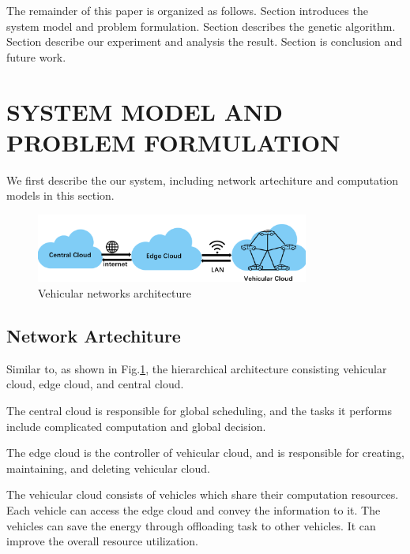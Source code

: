 \documentclass[conference]{IEEEtran}
\begin{document}
The remainder of this paper is organized as follows. Section \uppercase\expandafter{} introduces the system model and problem formulation. 
Section \uppercase\expandafter{} describes the genetic algorithm. 
Section \uppercase\expandafter{}  describe our experiment and analysis the result. 
Section \uppercase\expandafter{}
is conclusion and future work. 

\section{SYSTEM MODEL AND PROBLEM FORMULATION}
We first describe the our system, including network artechiture and computation models in this section.


\begin{figure}[h]
	\centering
	\includegraphics[width=0.80\textwidth]{pic2.png}
	\caption{Vehicular networks architecture}
	\label{cloud}
	
\end{figure}

\subsection{Network Artechiture}
Similar to\cite{yu2013toward}, as shown in Fig.\ref{cloud}, the hierarchical architecture consisting vehicular cloud, edge cloud, and central cloud.

The central cloud is responsible for global scheduling, and the tasks it performs include complicated computation and global decision.

The edge cloud is the controller of vehicular cloud, and is responsible for creating, maintaining, and deleting vehicular cloud. 

The vehicular cloud consists of vehicles which share their computation resources. Each vehicle can access the edge cloud and convey the information to it. The vehicles can save the energy through offloading task to other vehicles. It can improve the overall resource utilization. %
\end{document}
